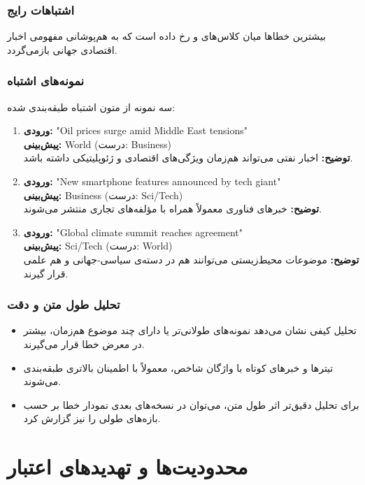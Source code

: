 \documentclass[12pt,a4paper]{article}
\begin{document}
\subsubsection{اشتباهات رایج}
بیشترین خطاها میان کلاس‌های  و  رخ داده است که به هم‌پوشانی مفهومی اخبار اقتصادی جهانی بازمی‌گردد.

\subsubsection{نمونه‌های اشتباه}
سه نمونه از متون اشتباه طبقه‌بندی شده:
\begin{enumerate}
\item \textbf{ورودی:} "Oil prices surge amid Middle East tensions" \\
\textbf{پیش‌بینی:} World (درست: Business) \\
\textbf{توضیح:} اخبار نفتی می‌تواند هم‌زمان ویژگی‌های اقتصادی و ژئوپلیتیکی داشته باشد.

\item \textbf{ورودی:} "New smartphone features announced by tech giant" \\
\textbf{پیش‌بینی:} Business (درست: Sci/Tech) \\
\textbf{توضیح:} خبرهای فناوری معمولاً همراه با مؤلفه‌های تجاری منتشر می‌شوند.

\item \textbf{ورودی:} "Global climate summit reaches agreement" \\
\textbf{پیش‌بینی:} Sci/Tech (درست: World) \\
\textbf{توضیح:} موضوعات محیط‌زیستی می‌توانند هم در دسته‌ی سیاسی-جهانی و هم علمی قرار گیرند.
\end{enumerate}

\subsubsection{تحلیل طول متن و دقت}
\begin{itemize}
\item تحلیل کیفی نشان می‌دهد نمونه‌های طولانی‌تر یا دارای چند موضوع هم‌زمان، بیشتر در معرض خطا قرار می‌گیرند.
\item تیترها و خبرهای کوتاه با واژگان شاخص، معمولاً با اطمینان بالاتری طبقه‌بندی می‌شوند.
\item برای تحلیل دقیق‌تر اثر طول متن، می‌توان در نسخه‌های بعدی نمودار خطا بر حسب بازه‌های طولی را نیز گزارش کرد.
\end{itemize}

\section{محدودیت‌ها و تهدیدهای اعتبار}
\end{document}
